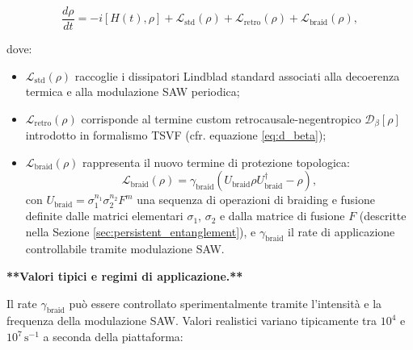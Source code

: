\documentclass[11pt,a4paper]{article}
\let\oldref\ref
\renewcommand{\ref}{\protect\oldref}
\theoremstyle{plain}
\theoremstyle{definition}
\begin{document}
\begin{tcolorbox}[colback=blue!3!white, colframe=blue!80!black, title={Master equation estesa con termini retrocausale-negentropico e braiding topologico}, sharp corners, boxrule=0.9pt]
\begin{equation}
\frac{d\rho}{dt} = -i [H(t),\rho] + \mathcal{L}_{\text{std}}(\rho) + \mathcal{L}_{\text{retro}}(\rho) + \mathcal{L}_{\text{braid}}(\rho),
\label{eq:master_full_braid}
\end{equation}

dove:
\begin{itemize}
    \item $\mathcal{L}_{\text{std}}(\rho)$ raccoglie i dissipatori Lindblad standard associati alla decoerenza termica e alla modulazione SAW periodica;
    \item $\mathcal{L}_{\text{retro}}(\rho)$ corrisponde al termine custom retrocausale-negentropico $\mathcal{D}_\beta[\rho]$ introdotto in formalismo TSVF (cfr. equazione \ref{eq:d_beta});
    \item $\mathcal{L}_{\text{braid}}(\rho)$ rappresenta il nuovo termine di protezione topologica:
    \begin{equation}
    \mathcal{L}_{\text{braid}}(\rho) = \gamma_{\text{braid}} \left( U_{\text{braid}} \rho U_{\text{braid}}^\dagger - \rho \right),
    \label{eq:L_braid}
    \end{equation}
    con $U_{\text{braid}} = \sigma_1^{n_1} \sigma_2^{n_2} F^{m}$ una sequenza di operazioni di braiding e fusione definite dalle matrici elementari $\sigma_1$, $\sigma_2$ e dalla matrice di fusione $F$ (descritte nella Sezione \ref{sec:persistent_entanglement}), e $\gamma_{\text{braid}}$ il rate di applicazione controllabile tramite modulazione SAW.
\end{itemize}
\end{tcolorbox}



\vspace{0.5cm}



\textbf{**Valori tipici e regimi di applicazione.**}

\vspace{0.2cm}


Il rate $\gamma_{\text{braid}}$ può essere controllato sperimentalmente tramite l’intensità e la frequenza della modulazione SAW. Valori realistici variano tipicamente tra $10^4$ e $10^7\,\text{s}^{-1}$ a seconda della piattaforma:

\vspace{0.3cm}
\end{document}
